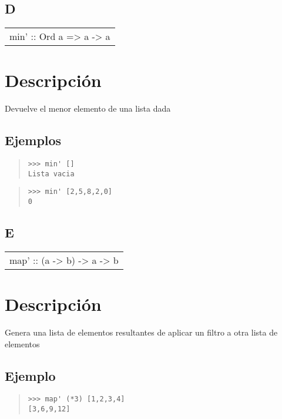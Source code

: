 \subsection{D}
\begin{haddockdesc}
\item[\begin{tabular}{@{}l}
min' :: Ord a => {\char 91}a{\char 93} -> a
\end{tabular}]
{\haddockbegindoc
\section*{Descripción}
Devuelve el menor elemento de una lista dada\par
\subsection*{Ejemplos}
\begin{quote}
{\haddockverb\begin{verbatim}
>>> min' []
Lista vacia

\end{verbatim}}
\end{quote}
\begin{quote}
{\haddockverb\begin{verbatim}
>>> min' [2,5,8,2,0]
0

\end{verbatim}}
\end{quote}}
\end{haddockdesc}
\subsection{E}
\begin{haddockdesc}
\item[\begin{tabular}{@{}l}
map' :: (a -> b) -> {\char 91}a{\char 93} -> {\char 91}b{\char 93}
\end{tabular}]
{\haddockbegindoc
\section*{Descripción}
Genera una lista de elementos resultantes de aplicar un filtro a otra lista de elementos\par
\subsection*{Ejemplo}
\begin{quote}
{\haddockverb\begin{verbatim}
>>> map' (*3) [1,2,3,4]
[3,6,9,12]

\end{verbatim}}
\end{quote}}
\end{haddockdesc}
